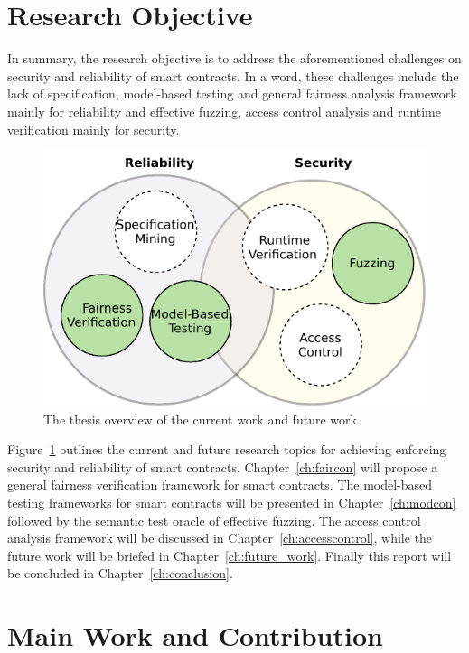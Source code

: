 \section{Research Objective}
In summary, the research objective is to address the aforementioned challenges on security and reliability of smart contracts.
In a word, these challenges include the lack of specification, model-based testing and general fairness analysis framework mainly for reliability and effective fuzzing, access control analysis and runtime verification mainly for security.
\begin{figure}
	\centering
	\includegraphics{./Figures/Chapter1/ThesisOverview}
	\caption{The thesis overview of the current work and future work.}
	\label{fig: thesisoverview}
\end{figure}

Figure~\ref{fig: thesisoverview} outlines the current and future research topics for achieving enforcing security and reliability of smart contracts.
Chapter~\ref{ch:faircon} will propose a general fairness verification framework for smart contracts.
The model-based testing frameworks for smart contracts will be presented in Chapter~\ref{ch:modcon} followed by the semantic test oracle of effective fuzzing.
The access control analysis framework will be discussed in Chapter~\ref{ch:accesscontrol},  while the future work will be briefed in Chapter~\ref{ch:future_work}.
Finally this report will be concluded in Chapter~\ref{ch:conclusion}.

\section{Main Work and Contribution}

